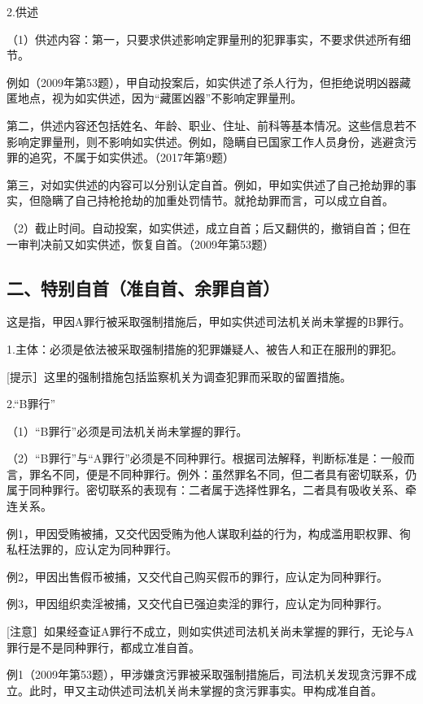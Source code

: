 2.供述

（1）供述内容：第一，只要求供述影响定罪量刑的犯罪事实，不要求供述所有细节。

例如（2009年第53题），甲自动投案后，如实供述了杀人行为，但拒绝说明凶器藏匿地点，视为如实供述，因为“藏匿凶器”不影响定罪量刑。

第二，供述内容还包括姓名、年龄、职业、住址、前科等基本情况。这些信息若不影响定罪量刑，则不影响如实供述。例如，隐瞒自已国家工作人员身份，逃避贪污罪的追究，不属于如实供述。（2017年第9题）

第三，对如实供述的内容可以分别认定自首。例如，甲如实供述了自己抢劫罪的事实，但隐瞒了自己持枪抢劫的加重处罚情节。就抢劫罪而言，可以成立自首。

（2）截止时间。自动投案，如实供述，成立自首；后又翻供的，撤销自首；但在一审判决前又如实供述，恢复自首。（2009年第53题）

\subsection*{二、特别自首（准自首、余罪自首）}

这是指，甲因A罪行被采取强制措施后，甲如实供述司法机关尚未掌握的B罪行。

1.主体：必须是依法被采取强制措施的犯罪嫌疑人、被告人和正在服刑的罪犯。

[提示］这里的强制措施包括监察机关为调查犯罪而采取的留置措施。

2.“B罪行”

（1）“B罪行”必须是司法机关尚未掌握的罪行。

（2）“B罪行”与“A罪行”必须是不同种罪行。根据司法解释，判断标准是：一般而言，罪名不同，便是不同种罪行。例外：虽然罪名不同，但二者具有密切联系，仍属于同种罪行。密切联系的表现有：二者属于选择性罪名，二者具有吸收关系、牵连关系。

例1，甲因受贿被捕，又交代因受贿为他人谋取利益的行为，构成滥用职权罪、徇私枉法罪的，应认定为同种罪行。

例2，甲因出售假币被捕，又交代自己购买假币的罪行，应认定为同种罪行。

例3，甲因组织卖淫被捕，又交代自已强迫卖淫的罪行，应认定为同种罪行。

[注意］如果经查证A罪行不成立，则如实供述司法机关尚未掌握的罪行，无论与A罪行是不是同种罪行，都成立准自首。

例1（2009年第53题），甲涉嫌贪污罪被采取强制措施后，司法机关发现贪污罪不成立。此时，甲又主动供述司法机关尚未掌握的贪污罪事实。甲构成准自首。

